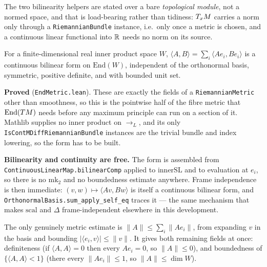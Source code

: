 \begin{lemma}
  The two bilinearity helpers are stated over a bare \emph{topological module}, not a normed
  space, and that is load-bearing rather than tidiness: $T_xM$ carries a norm only through a
  \texttt{RiemannianBundle} instance, i.e.\ only once a metric is chosen, and a continuous
  linear functional into $\mathbb{R}$ needs no norm on its source.
\end{lemma}

\begin{lemma}
  \label{lem:hs-form}
  \leanok
  For a finite-dimensional real inner product space $W$,
  $\langle A, B\rangle = \sum_i \langle A e_i, B e_i\rangle$ is a continuous bilinear form on
  $\mathrm{End}(W)$, independent of the orthonormal basis, symmetric, positive definite, and
  with bounded unit set.

  \textbf{Proved} (\texttt{EndMetric.lean}). These are exactly the fields of a
  \texttt{RiemannianMetric} other than smoothness, so this is the pointwise half of the fibre
  metric that $\mathrm{End}(TM)$ needs before any maximum principle can run on a section of
  it. Mathlib supplies no inner product on $\to_L$, and its only
  \texttt{IsContMDiffRiemannianBundle} instances are the trivial bundle and index lowering,
  so the form has to be built.

  \textbf{Bilinearity and continuity are free.} The form is assembled from
  \texttt{ContinuousLinearMap.bilinearComp} applied to $\mathrm{innerSL}$ and to evaluation at
  $e_i$, so there is no $\mathrm{mk}_2$ and no boundedness estimate anywhere. Frame
  independence is then immediate: $(v,w) \mapsto \langle A v, B w\rangle$ is itself a
  continuous bilinear form, and
  \texttt{OrthonormalBasis.sum\_apply\_self\_eq} traces it --- the same mechanism that makes
  $\mathrm{scal}$ and $\Delta$ frame-independent elsewhere in this development.

  The only genuinely metric estimate is $\|A\| \le \sum_i \|A e_i\|$, from expanding $v$ in the
  basis and bounding $|\langle e_i, v\rangle| \le \|v\|$. It gives both remaining fields at
  once: definiteness (if $\langle A,A\rangle = 0$ then every $A e_i = 0$, so $\|A\| \le 0$),
  and boundedness of $\{\langle A,A\rangle < 1\}$ (there every $\|A e_i\| \le 1$, so
  $\|A\| \le \dim W$).
\end{lemma}

